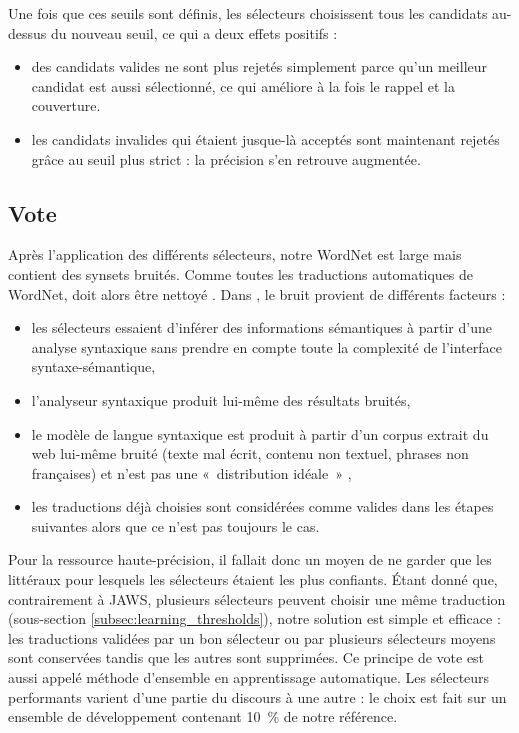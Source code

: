 Une fois que ces seuils sont définis, les sélecteurs choisissent tous les candidats au-dessus du nouveau seuil, ce qui a deux effets positifs :

\begin{itemize}
    \item des candidats valides ne sont plus rejetés simplement parce qu'un meilleur candidat est aussi sélectionné, ce qui améliore à la fois le rappel et la couverture.
    \item les candidats invalides qui étaient jusque-là acceptés sont maintenant rejetés grâce au seuil plus strict : la précision s'en retrouve augmentée.
\end{itemize}

\subsection{Vote}
\label{subsec:voting}

Après l'application des différents sélecteurs, notre WordNet est large mais contient des synsets bruités. Comme toutes les traductions automatiques de WordNet, \newjaws{} doit alors être nettoyé \citep{sagot2012cleaning}. Dans \newjaws{}, le bruit provient de différents facteurs :

\begin{itemize}
    \item les sélecteurs essaient d'inférer des informations sémantiques à partir d'une analyse syntaxique sans prendre en compte toute la complexité de l'interface syntaxe-sémantique,
    \item l'analyseur syntaxique produit lui-même des résultats bruités,
    \item le modèle de langue syntaxique est produit à partir d'un corpus extrait du web lui-même bruité (texte mal écrit, contenu non textuel, phrases non françaises) et n'est pas une «~distribution idéale~» \citep{copestake2012lexicalised},
    \item les traductions déjà choisies sont considérées comme valides dans les étapes suivantes alors que ce n'est pas toujours le cas.
\end{itemize}

Pour la ressource haute-précision, il fallait donc un moyen de ne garder que les littéraux pour lesquels les sélecteurs étaient les plus confiants. Étant donné que, contrairement à JAWS, plusieurs sélecteurs peuvent choisir une même traduction (sous-section \ref{subsec:learning_thresholds}), notre solution est simple et efficace : les traductions validées par un bon sélecteur ou par plusieurs sélecteurs moyens sont conservées tandis que les autres sont supprimées. Ce principe de vote est aussi appelé méthode d'ensemble en apprentissage automatique. Les sélecteurs performants varient d'une partie du discours à une autre : le choix est fait sur un ensemble de développement contenant 10~\% de notre référence.

